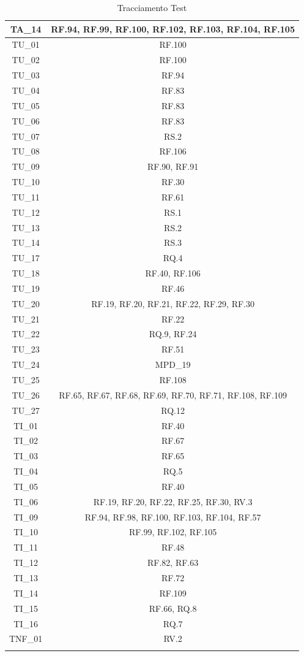 \documentclass[12pt, a4paper]{article}
\begin{document}
\begin{xltabular}{\textwidth}{|c|c|}
    TA\_14 & RF.94, RF.99, RF.100, RF.102, RF.103, RF.104, RF.105 \\\hline
    \hline
    TU\_01 & RF.100 \\\hline
    TU\_02 & RF.100 \\\hline
    TU\_03 & RF.94 \\\hline
    TU\_04 & RF.83 \\\hline
    TU\_05 & RF.83 \\\hline
    TU\_06 & RF.83 \\\hline
    TU\_07 & RS.2 \\\hline
    TU\_08 & RF.106 \\\hline
    TU\_09 & RF.90, RF.91 \\\hline
    TU\_10 & RF.30 \\\hline
    TU\_11 & RF.61 \\\hline
    TU\_12 & RS.1 \\\hline
    TU\_13 & RS.2 \\\hline
    TU\_14 & RS.3 \\\hline
    TU\_17 & RQ.4 \\\hline
    TU\_18 & RF.40, RF.106 \\\hline
    TU\_19 & RF.46 \\\hline
    TU\_20 & RF.19, RF.20, RF.21, RF.22, RF.29, RF.30 \\\hline
    TU\_21 & RF.22 \\\hline
    TU\_22 & RQ.9, RF.24 \\\hline
    TU\_23 & RF.51 \\\hline
    TU\_24 & MPD\_19 \\\hline
    TU\_25 & RF.108 \\\hline
    TU\_26 & RF.65, RF.67, RF.68, RF.69, RF.70, RF.71, RF.108, RF.109 \\\hline
    TU\_27 & RQ.12 \\\hline
    \hline
    TI\_01 & RF.40 \\\hline
    TI\_02 & RF.67 \\\hline
    TI\_03 & RF.65 \\\hline
    TI\_04 & RQ.5 \\\hline
    TI\_05 & RF.40 \\\hline
    TI\_06 & RF.19, RF.20, RF.22, RF.25, RF.30, RV.3 \\\hline
    TI\_09 & RF.94, RF.98, RF.100, RF.103, RF.104, RF.57 \\\hline
    TI\_10 & RF.99, RF.102, RF.105 \\\hline
    TI\_11 & RF.48 \\\hline
    TI\_12 & RF.82, RF.63 \\\hline
    TI\_13 & RF.72 \\\hline
    TI\_14 & RF.109 \\\hline
    TI\_15 & RF.66, RQ.8 \\\hline
    TI\_16 & RQ.7 \\\hline
    \hline
    TNF\_01 & RV.2 \\\hline
    \caption{Tracciamento Test}
    \label{tab:tracciamento_test}
\end{xltabular}
\end{document}
